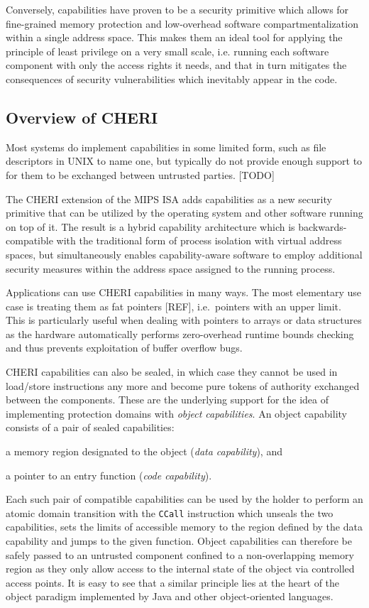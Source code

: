 \documentclass[a4paper,12pt,twoside,openright]{report}
\newcommand{\insn}[1]{\texttt{#1}}
\begin{document}
Conversely, capabilities have proven to be a security primitive which allows for fine-grained memory protection and low-overhead software compartmentalization within a single address space. This makes them an ideal tool for applying the principle of least privilege on a very small scale, i.e. running each software component with only the access rights it needs, and that in turn mitigates the consequences of security vulnerabilities which inevitably appear in the code. 

\subsection{Overview of CHERI}

Most systems do implement capabilities in some limited form, such as file descriptors in UNIX to name one, but typically do not provide enough support to for them to be exchanged between untrusted parties. [TODO]

The CHERI extension of the MIPS ISA adds capabilities as a new security primitive that can be utilized by the operating system and other software running on top of it. The result is a hybrid capability architecture which is backwards-compatible with the traditional form of process isolation with virtual address spaces, but simultaneously enables capability-aware software to employ additional security measures within the address space assigned to the running process.

Applications can use CHERI capabilities in many ways. The most elementary use case is treating them as fat pointers [REF], i.e.\ pointers with an upper limit. This is particularly useful when dealing with pointers to arrays or data structures as the hardware automatically performs zero-overhead runtime bounds checking and thus prevents exploitation of buffer overflow bugs. 

CHERI capabilities can also be sealed, in which case they cannot be used in load/store instructions any more and become pure tokens of authority exchanged between the components. These are the underlying support for the idea of implementing protection domains with \emph{object capabilities}. An object capability consists of a pair of sealed capabilities: 
\begin{inparaenum}
\item a memory region designated to the object (\emph{data capability}), and
\item a pointer to an entry function (\emph{code capability}).
\end{inparaenum}
Each such pair of compatible capabilities can be used by the holder to perform an atomic domain transition with the \insn{CCall} instruction which unseals the two capabilities, sets the limits of accessible memory to the region defined by the data capability and jumps to the given function. Object capabilities can therefore be safely passed to an untrusted component confined to a non-overlapping memory region as they only allow access to the internal state of the object via controlled access points. It is easy to see that a similar principle lies at the heart of the object paradigm implemented by Java and other object-oriented languages.
\end{document}
